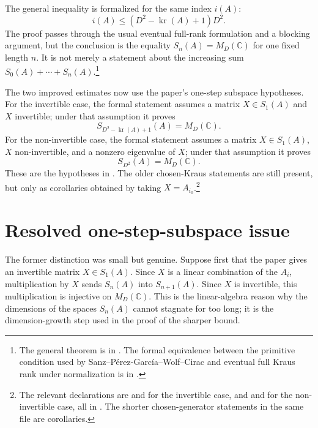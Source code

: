 \documentclass{article}
\begin{document}
The general inequality is formalized for the same index $i(A)$:
\[
    i(A)\leq (D^2-\operatorname{kr}(A)+1)D^2.
\]
The proof passes through the usual eventual full-rank formulation and a
blocking argument, but the conclusion is the equality
$S_n(A)=M_D(\mathbb C)$ for one fixed length $n$. It is not merely a statement
about the increasing sum $S_0(A)+\cdots+S_n(A)$.\footnote{The general
    theorem is 
    in . The
    formal equivalence between the primitive condition used by Sanz--P\'erez-Garc\'ia--Wolf--Cirac
    and eventual full Kraus rank under normalization is in
    .}

The two improved estimates now use the paper's one-step subspace hypotheses.
For the invertible case, the formal statement assumes a matrix
$X\in S_1(A)$ and $X$ invertible; under that assumption it proves
\[
    S_{D^2-\operatorname{kr}(A)+1}(A)=M_D(\mathbb C).
\]
For the non-invertible case, the formal statement assumes a matrix
$X\in S_1(A)$, $X$ non-invertible, and a nonzero eigenvalue of $X$;
under that assumption it proves
\[
    S_{D^2}(A)=M_D(\mathbb C).
\]
These are the hypotheses in \cite[Theorem~1]{Sanz2010Quantum}. The older
chosen-Kraus statements are still present, but only as corollaries obtained by
taking $X=A_{i_0}$.\footnote{The relevant declarations are
     and
     for the invertible case, and
     and
     for
    the non-invertible case, all in
    . The shorter
    chosen-generator statements in the same file are corollaries.}

\section{Resolved one-step-subspace issue}

The former distinction was small but genuine. Suppose first that the paper gives an
invertible matrix $X\in S_1(A)$. Since $X$ is a linear combination of the
$A_i$, multiplication by $X$ sends $S_n(A)$ into $S_{n+1}(A)$. Since $X$ is
invertible, this multiplication is injective on $M_D(\mathbb C)$. This is the
linear-algebra reason why the dimensions of the spaces $S_n(A)$ cannot stagnate
for too long; it is the dimension-growth step used in the proof of the sharper
bound.
\end{document}
